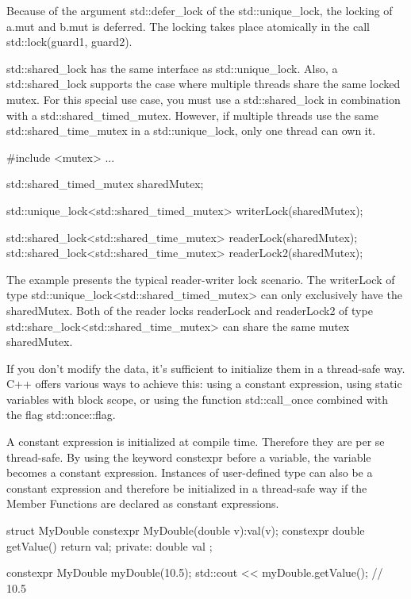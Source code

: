 Because of the argument std::defer\_lock of the std::unique\_lock, the locking of a.mut and b.mut is deferred. The locking takes place atomically in the call std::lock(guard1, guard2).



std::shared\_lock has the same interface as std::unique\_lock. Also, a std::shared\_lock supports the case where multiple threads share the same locked mutex. For this special use case, you must use a std::shared\_lock in combination with a std::shared\_timed\_mutex. However, if multiple threads use the same std::shared\_time\_mutex in a std::unique\_lock, only one thread can own it.

\begin{cpp}
#include <mutex>
...

std::shared_timed_mutex sharedMutex;

std::unique_lock<std::shared_timed_mutex> writerLock(sharedMutex);

std::shared_lock<std::shared_time_mutex> readerLock(sharedMutex);
std::shared_lock<std::shared_time_mutex> readerLock2(sharedMutex);
\end{cpp}

The example presents the typical reader-writer lock scenario. The writerLock of type std::unique\_lock<std::shared\_timed\_mutex> can only exclusively have the sharedMutex. Both of the reader locks readerLock and readerLock2 of type std::share\_lock<std::shared\_time\_mutex> can share the same mutex sharedMutex.


If you don’t modify the data, it’s sufficient to initialize them in a thread-safe way. C++ offers various ways to achieve this: using a constant expression, using static variables with block scope, or using the function std::call\_once combined with the flag std::once::flag.



A constant expression is initialized at compile time. Therefore they are per se thread-safe. By using the keyword constexpr before a variable, the variable becomes a constant expression. Instances of user-defined type can also be a constant expression and therefore be initialized in a thread-safe way if the Member Functions are declared as constant expressions.

\begin{cpp}
struct MyDouble{
	constexpr MyDouble(double v):val(v){};
	constexpr double getValue(){ return val; }
private:
	double val
};

constexpr MyDouble myDouble(10.5);
std::cout << myDouble.getValue(); // 10.5
\end{cpp}

